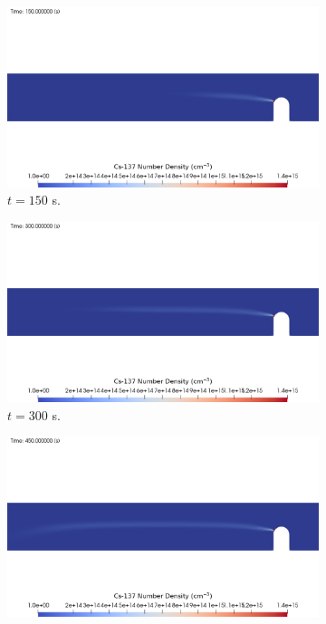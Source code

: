 \begin{figure}[H]
    \centering
    \begin{subfigure}[b]{0.68\textwidth}
        \centering
        \includegraphics[width=\textwidth]{images/demos/plume/cs/cs137_150s.png}
        \caption{$t = 150$ s.}
        \label{fig:demo:plume:flow:cs:150}
    \end{subfigure}
    \hfill
    \begin{subfigure}[b]{0.68\textwidth}
        \centering
        \includegraphics[width=\textwidth]{images/demos/plume/cs/cs137_300s.png}
        \caption{$t = 300$ s.}
        \label{fig:demo:plume:flow:cs:300}
    \end{subfigure}
    \hfill
    \begin{subfigure}[b]{0.68\textwidth}
        \centering
        \includegraphics[width=\textwidth]{images/demos/plume/cs/cs137_450s.png}

\end{subfigure}
\end{figure}
